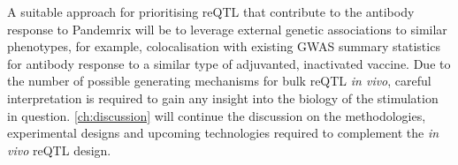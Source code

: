 A suitable approach for prioritising reQTL that contribute to the antibody response to Pandemrix will be to leverage external genetic associations to similar phenotypes,
for example, colocalisation with existing GWAS summary statistics for antibody response to a similar type of adjuvanted, inactivated vaccine.
%
%
Due to the number of possible generating mechanisms for bulk reQTL \textit{in vivo},
careful interpretation is required to gain any insight into the biology of the stimulation in question.
\cref{ch:discussion} will continue the discussion on the methodologies, experimental designs and upcoming technologies 
required to complement the \textit{in vivo} \gls{reQTL} design.





%

